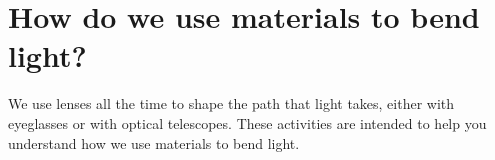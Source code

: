 %	
%	
%	
%
%

\section{How do we use materials to bend light?}

We use lenses all the time to shape the path that light takes, either with eyeglasses or with optical telescopes. These activities are intended to help you understand how we use materials to bend light.

